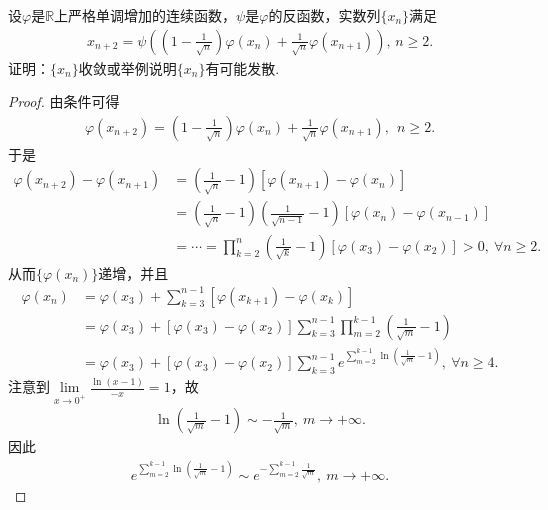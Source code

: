 \documentclass[../../main.tex]{subfiles}%
\begin{document}
\begin{example}
设$\varphi$是$\mathbb{R}$上严格单调增加的连续函数，$\psi$是$\varphi$的反函数，实数列$\{x_n\}$满足
\begin{align*}
x_{n+2} = \psi\left( \left(1 - \frac{1}{\sqrt{n}}\right)\varphi(x_n) + \frac{1}{\sqrt{n}}\varphi(x_{n+1}) \right), \, n \geqslant 2.
\end{align*}
证明：$\{x_n\}$收敛或举例说明$\{x_n\}$有可能发散.
\end{example}
\begin{proof}

由条件可得
\begin{align*}
\varphi(x_{n+2}) = \left(1 - \frac{1}{\sqrt{n}}\right)\varphi(x_n) + \frac{1}{\sqrt{n}}\varphi(x_{n+1}),\ \ n \geqslant 2.
\end{align*}
于是
\begin{align*}
\varphi(x_{n+2}) - \varphi(x_{n+1}) &= \left( \frac{1}{\sqrt{n}} - 1 \right)\left[ \varphi(x_{n+1}) - \varphi(x_n) \right] \\
&= \left( \frac{1}{\sqrt{n}} - 1 \right)\left( \frac{1}{\sqrt{n-1}} - 1 \right)\left[ \varphi(x_n) - \varphi(x_{n-1}) \right] \\
&= \cdots = \prod_{k=2}^n \left( \frac{1}{\sqrt{k}} - 1 \right)\left[ \varphi(x_3) - \varphi(x_2) \right] > 0,\ \forall n \geqslant 2.
\end{align*}
从而$\{\varphi(x_n)\}$递增，并且
\begin{align}
\varphi(x_n) &= \varphi(x_3) + \sum\limits_{k=3}^{n-1} \left[ \varphi(x_{k+1}) - \varphi(x_k) \right]\nonumber \\
&= \varphi(x_3) + \left[ \varphi(x_3) - \varphi(x_2) \right] \sum\limits_{k=3}^{n-1} \prod_{m=2}^{k-1} \left( \frac{1}{\sqrt{m}} - 1 \right) \nonumber \\
&= \varphi(x_3) + \left[ \varphi(x_3) - \varphi(x_2) \right] \sum\limits_{k=3}^{n-1} e^{\sum\limits_{m=2}^{k-1} \ln\left( \frac{1}{\sqrt{m}} - 1 \right)},\ \forall n \geqslant 4. \label{eq::382wer346456yt34t3y4g44j76k67opp}
\end{align}
注意到$\lim\limits_{x \to 0^+} \frac{\ln(x - 1)}{-x} = 1$，故
\begin{align*}
\ln\left( \frac{1}{\sqrt{m}} - 1 \right) \sim -\frac{1}{\sqrt{m}},\ m \to +\infty.
\end{align*}
因此
\begin{align*}
e^{\sum\limits_{m=2}^{k-1} \ln\left( \frac{1}{\sqrt{m}} - 1 \right)} \sim e^{-\sum\limits_{m=2}^{k-1} \frac{1}{\sqrt{m}}},\ m \to +\infty.
\end{align*}

\end{proof}
\end{document}
